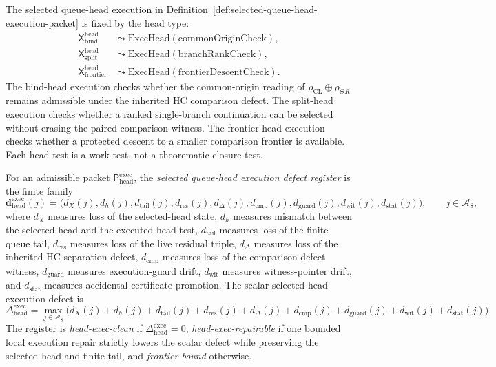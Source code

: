 \begin{definition}
\label{def:executed-queue-head-tests}
The selected queue-head execution in Definition~\ref{def:selected-queue-head-execution-packet} is fixed by the head type:
\[
\begin{aligned}
 \mathsf X_{\mathrm{bind}}^{\mathrm{head}}
 &\leadsto
 \mathrm{ExecHead}(\mathrm{commonOriginCheck}),\\
 \mathsf X_{\mathrm{split}}^{\mathrm{head}}
 &\leadsto
 \mathrm{ExecHead}(\mathrm{branchRankCheck}),\\
 \mathsf X_{\mathrm{frontier}}^{\mathrm{head}}
 &\leadsto
 \mathrm{ExecHead}(\mathrm{frontierDescentCheck}).
\end{aligned}
\]
The bind-head execution checks whether the common-origin reading of \(\rho_{\mathrm{CL}}\oplus\rho_{\Theta R}\) remains admissible under the inherited HC comparison defect. The split-head execution checks whether a ranked single-branch continuation can be selected without erasing the paired comparison witness. The frontier-head execution checks whether a protected descent to a smaller comparison frontier is available. Each head test is a work test, not a theorematic closure test.
\end{definition}

\begin{definition}
\label{def:selected-queue-head-execution-defect-register}
For an admissible packet \(\mathsf P_{\mathrm{head}}^{\mathrm{exec}}\), the \emph{selected queue-head execution defect register} is the finite family
\[
 \mathbf d_{\mathrm{head}}^{\mathrm{exec}}(j)
 =
 \bigl(d_X(j),d_h(j),d_{\mathrm{tail}}(j),d_{\mathrm{res}}(j),
 d_{\Delta}(j),d_{\mathrm{cmp}}(j),d_{\mathrm{guard}}(j),d_{\mathrm{wit}}(j),d_{\mathrm{stat}}(j)\bigr),
 \qquad j\in\mathcal A_8,
\]
where \(d_X\) measures loss of the selected-head state, \(d_h\) measures mismatch between the selected head and the executed head test, \(d_{\mathrm{tail}}\) measures loss of the finite queue tail, \(d_{\mathrm{res}}\) measures loss of the live residual triple, \(d_{\Delta}\) measures loss of the inherited HC separation defect, \(d_{\mathrm{cmp}}\) measures loss of the comparison-defect witness, \(d_{\mathrm{guard}}\) measures execution-guard drift, \(d_{\mathrm{wit}}\) measures witness-pointer drift, and \(d_{\mathrm{stat}}\) measures accidental certificate promotion. The scalar selected-head execution defect is
\[
 \Delta_{\mathrm{head}}^{\mathrm{exec}}
 =
 \max_{j\in\mathcal A_8}
 \bigl(d_X(j)+d_h(j)+d_{\mathrm{tail}}(j)+d_{\mathrm{res}}(j)+d_{\Delta}(j)
 +d_{\mathrm{cmp}}(j)+d_{\mathrm{guard}}(j)+d_{\mathrm{wit}}(j)+d_{\mathrm{stat}}(j)\bigr).
\]
The register is \emph{head-exec-clean} if \(\Delta_{\mathrm{head}}^{\mathrm{exec}}=0\), \emph{head-exec-repairable} if one bounded local execution repair strictly lowers the scalar defect while preserving the selected head and finite tail, and \emph{frontier-bound} otherwise.
\end{definition}

